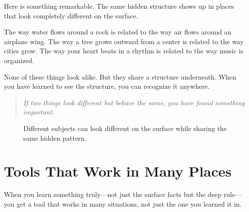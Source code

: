 \documentclass[12pt]{book}
\begin{document}
Here is something remarkable. The same hidden structure shows up in places
that look completely different on the surface.

The way water flows around a rock is related to the way air flows around
an airplane wing. The way a tree grows outward from a center is related to
the way cities grow. The way your heart beats in a rhythm is related to
the way music is organized.

None of these things look alike. But they share a structure underneath.
When you have learned to see the structure, you can recognize it anywhere.

\begin{quote}\itshape
If two things look different but behave the same,
you have found something important.
\end{quote}

\begin{figure}[h!]
\centering
{}
\caption{Different subjects can look different on the surface while sharing the same hidden pattern.}
\end{figure}

\section{Tools That Work in Many Places}

When you learn something truly---not just the surface facts but the deep
rule---you get a tool that works in many situations, not just the one you
learned it in.
\end{document}
